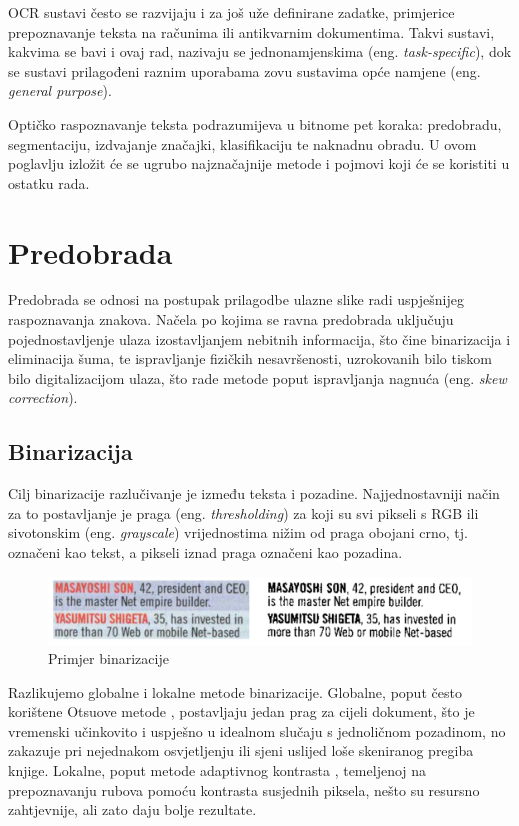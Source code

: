 \documentclass[zavrsnirad]{fer}
\begin{document}
OCR sustavi često se razvijaju i za još uže definirane zadatke, primjerice prepoznavanje teksta na računima ili antikvarnim dokumentima. Takvi sustavi, kakvima se bavi i ovaj rad, nazivaju se jednonamjenskima (eng. \textit{task-specific}), dok se sustavi prilagođeni raznim uporabama zovu sustavima opće namjene (eng. \textit{general purpose}). \cite{Borovikov2014}

Optičko raspoznavanje teksta podrazumijeva u bitnome pet koraka: predobradu, segmentaciju, izdvajanje značajki, klasifikaciju te naknadnu obradu. \cite{Dhande2017} U ovom poglavlju izložit će se ugrubo najznačajnije metode i pojmovi koji će se koristiti u ostatku rada.

\section{Predobrada}

Predobrada se odnosi na postupak prilagodbe ulazne slike radi uspješnijeg raspoznavanja znakova. Načela po kojima se ravna predobrada uključuju pojednostavljenje ulaza izostavljanjem nebitnih informacija, što čine binarizacija i eliminacija šuma, te ispravljanje fizičkih nesavršenosti, uzrokovanih bilo tiskom bilo digitalizacijom ulaza, što rade metode poput ispravljanja nagnuća (eng. \textit{skew correction}).

\subsection{Binarizacija}
\label{Binarizacija}

Cilj binarizacije razlučivanje je između teksta i pozadine. Najjednostavniji način za to postavljanje je praga (eng. \textit{thresholding}) za koji su svi pikseli s RGB ili sivotonskim (eng. \textit{grayscale}) vrijednostima nižim od praga obojani crno, tj. označeni kao tekst, a pikseli iznad praga označeni kao pozadina. \cite{Jyotsna2016}

\begin{figure}[hbt]
	\centering
	\includegraphics[width=0.9\linewidth]{Figures/binarization.png} 
	\caption{Primjer binarizacije \cite{binarization-image}}
	\label{slk:binarizacija}
\end{figure}

Razlikujemo globalne i lokalne metode binarizacije. Globalne, poput često korištene Otsuove  metode \cite{Otsu1979}, postavljaju jedan prag za cijeli dokument, što je vremenski učinkovito i uspješno u idealnom slučaju s jednoličnom pozadinom, no zakazuje pri nejednakom osvjetljenju ili sjeni uslijed loše skeniranog pregiba knjige. Lokalne, poput metode adaptivnog kontrasta \cite{Su2013}, temeljenoj na prepoznavanju rubova pomoću kontrasta susjednih piksela, nešto su resursno zahtjevnije, ali zato daju bolje rezultate. \cite{Otsu1979, Su2013}
\end{document}
